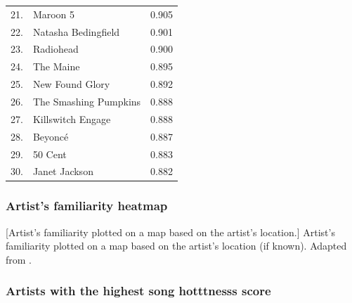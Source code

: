 \documentclass[                                                             %
        12pt,                                                                   %
        twoside                                                                 %
    ]{scrartcl}                                                                 %
\begin{document}
{\begin{longtabu}{r l r}
	21. & Maroon 5                   & 0.905 \\
	22. & Natasha Bedingfield        & 0.901 \\
	23. & Radiohead                  & 0.900 \\
	24. & The Maine                  & 0.895 \\
	25. & New Found Glory            & 0.892 \\
	26. & The Smashing Pumpkins      & 0.888 \\
	27. & Killswitch Engage          & 0.888 \\
	28. & Beyoncé                    & 0.887 \\
	29. & 50 Cent                    & 0.883 \\
	30. & Janet Jackson              & 0.882
\end{longtabu}
}

\subsubsection{Artist's familiarity heatmap}

\begin{minipage}{\linewidth}
    \centering
    [Artist's familiarity plotted on a map based on the artist's location.]{%
        Artist's familiarity plotted on a map based on the artist's location (if known).
        Adapted from \textcite{gaba2008tissot}.
    }
    \label{fig:average-familiarity-by-artist-b}
\end{minipage}

\subsubsection{Artists with the highest song hotttnesss score}
\end{document}
